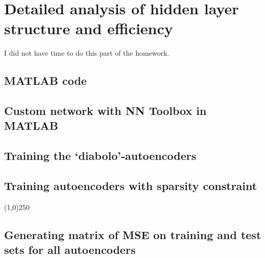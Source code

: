 \documentclass{article}
\begin{document}
\section{Detailed analysis of hidden layer structure and efficiency}
I did not have time to do this part of the homework.


\begin{appendices}
\section{MATLAB code}
\subsection{Custom network with NN Toolbox in MATLAB}
\label{app:create}

\subsection{Training the `diabolo'-autoencoders}
\label{app:train_diabolo}

\subsection{Training autoencoders with sparsity constraint}
\label{app:sparse}

\begin{center}
\line(1,0){250}
\end{center}

\subsection{Generating matrix of MSE on training and test sets for all autoencoders}
\label{app:msemat}

\end{appendices}
\end{document}
